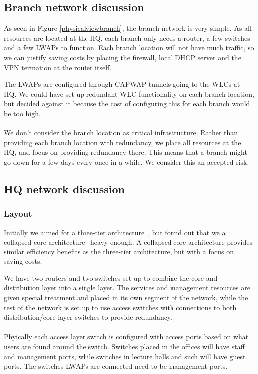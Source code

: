 
\subsection{Branch network discussion}


As seen in Figure \ref{physicalviewbranch}, the branch network is very simple. As all resources are located at the HQ, each branch only needs a router, a few switches and a few LWAPs to function. Each branch location will not have much traffic, so we can justify saving costs by placing the firewall, local DHCP server and the VPN termation at the router itself.

The LWAPs are configured through CAPWAP tunnels going to the WLCs at HQ. We could have set up redundant WLC functionality on each branch location, but decided against it because the cost of configuring this for each branch would be too high.
\\
\\
We don't consider the branch location as critical infrastructure. Rather than providing each branch location with redundancy, we place all resources at the HQ, and focus on providing redundancy there. This means that a branch might go down for a few days every once in a while. We consider this an accepted risk.

\subsection{HQ network discussion}

\subsubsection{Layout}

Initially we aimed for a three-tier architecture~\cite{todo}, but found out that we a collapsed-core architecture~\cite{todo} heavy enough. A collapsed-core architecture provides similar efficiency benefits as the three-tier architecture, but with a focus on saving costs.

We have two routers and two switches set up to combine the core and distribution layer into a single layer. The services and management resources are given special treatment and placed in its own segment of the network, while the rest of the network is set up to use access switches with connections to both distribution/core layer switches to provide redundancy.
\\
\\
Phyically each access layer switch is configured with access ports based on what users are found around the switch. Switches placed in the offices will have staff and management ports, while switches in lecture halls and such will have guest ports. The switches LWAPs are connected need to be management ports. 

